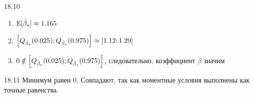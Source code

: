\protect \hypertarget {soln:18.10}{}
\begin{solution}{{18.10}}
\begin{enumerate}
\item $\mathbb{E} [\hat{\beta}_*] \approx 1.165 $
\item $\left[ Q_{\hat{\beta}_*} (0.025);  Q_{\hat{\beta}_*} (0.975) \right] \approx \left[1.12; 1.29 \right] $
\item $0 \notin  \left[ Q_{\hat{\beta}_*} (0.025);  Q_{\hat{\beta}_*} (0.975) \right]$, следовательно, коэффициент $\beta$ значим
\end{enumerate}
\end{solution}
\protect \hypertarget {soln:18.11}{}
\begin{solution}{{18.11}}
Минимум равен $0$. Совпадают, так как моментные условия выполнены как точные равенства.
\end{solution}
